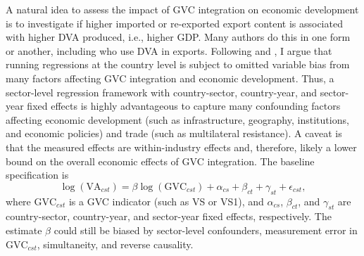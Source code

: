 \documentclass[a4paper]{article}
\begin{document}
A natural idea to assess the impact of GVC integration on economic development is to investigate if higher imported or re-exported export content is associated with higher DVA produced, i.e., higher GDP. Many authors do this in one form or another, including \citet{lwesya2022integration} who use DVA in exports. Following \citet{Kummritz20161} and \citet{rodriguez2000trade}, I argue that running regressions at the country level is subject to omitted variable bias from many factors affecting GVC integration and economic development. Thus, a sector-level regression framework with country-sector, country-year, and sector-year fixed effects is highly advantageous to capture many confounding factors affecting economic development (such as infrastructure, geography, institutions, and economic policies) and trade (such as multilateral resistance). A caveat is that the measured effects are within-industry effects and, therefore, likely a lower bound on the overall economic effects of GVC integration. The baseline specification is 
%
\begin{equation} \label{eq:VA_HDFE}
\log(\text{VA}_{cst}) = \beta \log(\text{GVC}_{cst}) + \alpha_{cs} + \beta_{ct} +\gamma_{st} + \epsilon_{cst},
\end{equation}
%
where $\text{GVC}_{cst}$ is a GVC indicator (such as VS or VS1), and $\alpha_{cs}$, $\beta_{ct}$, and $\gamma_{st}$ are country-sector, country-year, and sector-year fixed effects, respectively. The estimate $\beta$ could still be biased by sector-level confounders, measurement error in $\text{GVC}_{cst}$, simultaneity, and reverse causality.  \newline
\end{document}
